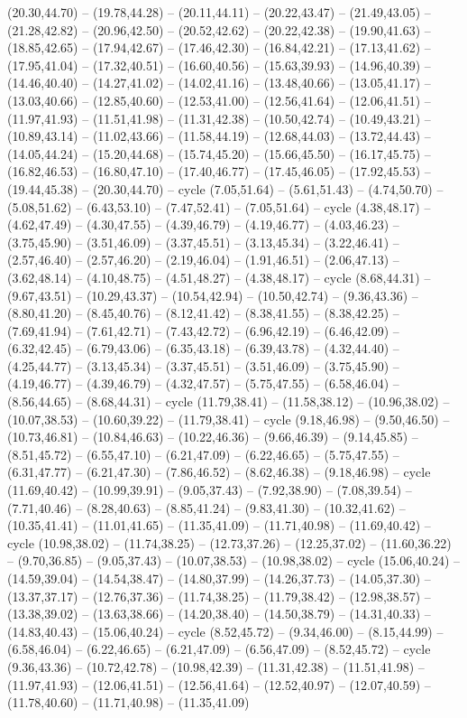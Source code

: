 {(20.30,44.70) -- (19.78,44.28) -- (20.11,44.11) -- (20.22,43.47) -- (21.49,43.05) -- (21.28,42.82) -- (20.96,42.50) -- (20.52,42.62) -- (20.22,42.38) -- (19.90,41.63) -- (18.85,42.65) -- (17.94,42.67) -- (17.46,42.30) -- (16.84,42.21) -- (17.13,41.62) -- (17.95,41.04) -- (17.32,40.51) -- (16.60,40.56) -- (15.63,39.93) -- (14.96,40.39) -- (14.46,40.40) -- (14.27,41.02) -- (14.02,41.16) -- (13.48,40.66) -- (13.05,41.17) -- (13.03,40.66) -- (12.85,40.60) -- (12.53,41.00) -- (12.56,41.64) -- (12.06,41.51) -- (11.97,41.93) -- (11.51,41.98) -- (11.31,42.38) -- (10.50,42.74) -- (10.49,43.21) -- (10.89,43.14) -- (11.02,43.66) -- (11.58,44.19) -- (12.68,44.03) -- (13.72,44.43) -- (14.05,44.24) -- (15.20,44.68) -- (15.74,45.20) -- (15.66,45.50) -- (16.17,45.75) -- (16.82,46.53) -- (16.80,47.10) -- (17.40,46.77) -- (17.45,46.05) -- (17.92,45.53) -- (19.44,45.38) -- (20.30,44.70) -- cycle (7.05,51.64) -- (5.61,51.43) -- (4.74,50.70) -- (5.08,51.62) -- (6.43,53.10) -- (7.47,52.41) -- (7.05,51.64) -- cycle (4.38,48.17) -- (4.62,47.49) -- (4.30,47.55) -- (4.39,46.79) -- (4.19,46.77) -- (4.03,46.23) -- (3.75,45.90) -- (3.51,46.09) -- (3.37,45.51) -- (3.13,45.34) -- (3.22,46.41) -- (2.57,46.40) -- (2.57,46.20) -- (2.19,46.04) -- (1.91,46.51) -- (2.06,47.13) -- (3.62,48.14) -- (4.10,48.75) -- (4.51,48.27) -- (4.38,48.17) -- cycle (8.68,44.31) -- (9.67,43.51) -- (10.29,43.37) -- (10.54,42.94) -- (10.50,42.74) -- (9.36,43.36) -- (8.80,41.20) -- (8.45,40.76) -- (8.12,41.42) -- (8.38,41.55) -- (8.38,42.25) -- (7.69,41.94) -- (7.61,42.71) -- (7.43,42.72) -- (6.96,42.19) -- (6.46,42.09) -- (6.32,42.45) -- (6.79,43.06) -- (6.35,43.18) -- (6.39,43.78) -- (4.32,44.40) -- (4.25,44.77) -- (3.13,45.34) -- (3.37,45.51) -- (3.51,46.09) -- (3.75,45.90) -- (4.19,46.77) -- (4.39,46.79) -- (4.32,47.57) -- (5.75,47.55) -- (6.58,46.04) -- (8.56,44.65) -- (8.68,44.31) -- cycle (11.79,38.41) -- (11.58,38.12) -- (10.96,38.02) -- (10.07,38.53) -- (10.60,39.22) -- (11.79,38.41) -- cycle (9.18,46.98) -- (9.50,46.50) -- (10.73,46.81) -- (10.84,46.63) -- (10.22,46.36) -- (9.66,46.39) -- (9.14,45.85) -- (8.51,45.72) -- (6.55,47.10) -- (6.21,47.09) -- (6.22,46.65) -- (5.75,47.55) -- (6.31,47.77) -- (6.21,47.30) -- (7.86,46.52) -- (8.62,46.38) -- (9.18,46.98) -- cycle (11.69,40.42) -- (10.99,39.91) -- (9.05,37.43) -- (7.92,38.90) -- (7.08,39.54) -- (7.71,40.46) -- (8.28,40.63) -- (8.85,41.24) -- (9.83,41.30) -- (10.32,41.62) -- (10.35,41.41) -- (11.01,41.65) -- (11.35,41.09) -- (11.71,40.98) -- (11.69,40.42) -- cycle (10.98,38.02) -- (11.74,38.25) -- (12.73,37.26) -- (12.25,37.02) -- (11.60,36.22) -- (9.70,36.85) -- (9.05,37.43) -- (10.07,38.53) -- (10.98,38.02) -- cycle (15.06,40.24) -- (14.59,39.04) -- (14.54,38.47) -- (14.80,37.99) -- (14.26,37.73) -- (14.05,37.30) -- (13.37,37.17) -- (12.76,37.36) -- (11.74,38.25) -- (11.79,38.42) -- (12.98,38.57) -- (13.38,39.02) -- (13.63,38.66) -- (14.20,38.40) -- (14.50,38.79) -- (14.31,40.33) -- (14.83,40.43) -- (15.06,40.24) -- cycle (8.52,45.72) -- (9.34,46.00) -- (8.15,44.99) -- (6.58,46.04) -- (6.22,46.65) -- (6.21,47.09) -- (6.56,47.09) -- (8.52,45.72) -- cycle (9.36,43.36) -- (10.72,42.78) -- (10.98,42.39) -- (11.31,42.38) -- (11.51,41.98) -- (11.97,41.93) -- (12.06,41.51) -- (12.56,41.64) -- (12.52,40.97) -- (12.07,40.59) -- (11.78,40.60) -- (11.71,40.98) -- (11.35,41.09) }

